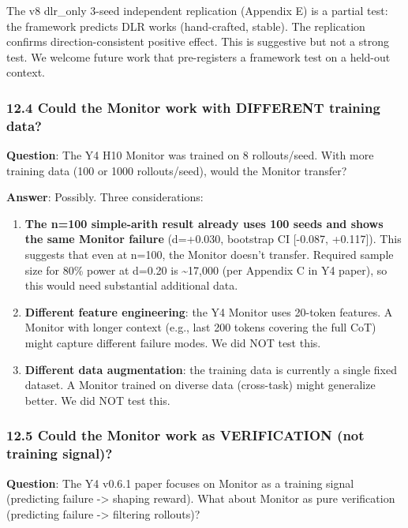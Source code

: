 \documentclass[
]{article}
\begin{document}
The v8 dlr\_only 3-seed independent replication (Appendix E) is a
partial test: the framework predicts DLR works (hand-crafted, stable).
The replication confirms direction-consistent positive effect. This is
suggestive but not a strong test. We welcome future work that
pre-registers a framework test on a held-out context.

\subsubsection{12.4 Could the Monitor work with DIFFERENT training
data?}\label{could-the-monitor-work-with-different-training-data}

\textbf{Question}: The Y4 H10 Monitor was trained on 8 rollouts/seed.
With more training data (100 or 1000 rollouts/seed), would the Monitor
transfer?

\textbf{Answer}: Possibly. Three considerations:

\begin{enumerate}
\def\labelenumi{\arabic{enumi}.}
\item
  \textbf{The n=100 simple-arith result already uses 100 seeds and shows
  the same Monitor failure} (d=+0.030, bootstrap CI {[}-0.087,
  +0.117{]}). This suggests that even at n=100, the Monitor doesn't
  transfer. Required sample size for 80\% power at d=0.20 is
  \textasciitilde17,000 (per Appendix C in Y4 paper), so this would need
  substantial additional data.
\item
  \textbf{Different feature engineering}: the Y4 Monitor uses 20-token
  features. A Monitor with longer context (e.g., last 200 tokens
  covering the full CoT) might capture different failure modes. We did
  NOT test this.
\item
  \textbf{Different data augmentation}: the training data is currently a
  single fixed dataset. A Monitor trained on diverse data (cross-task)
  might generalize better. We did NOT test this.
\end{enumerate}

\subsubsection{12.5 Could the Monitor work as VERIFICATION (not training
signal)?}\label{could-the-monitor-work-as-verification-not-training-signal}

\textbf{Question}: The Y4 v0.6.1 paper focuses on Monitor as a training
signal (predicting failure -\textgreater{} shaping reward). What about
Monitor as pure verification (predicting failure -\textgreater{}
filtering rollouts)?
\end{document}
